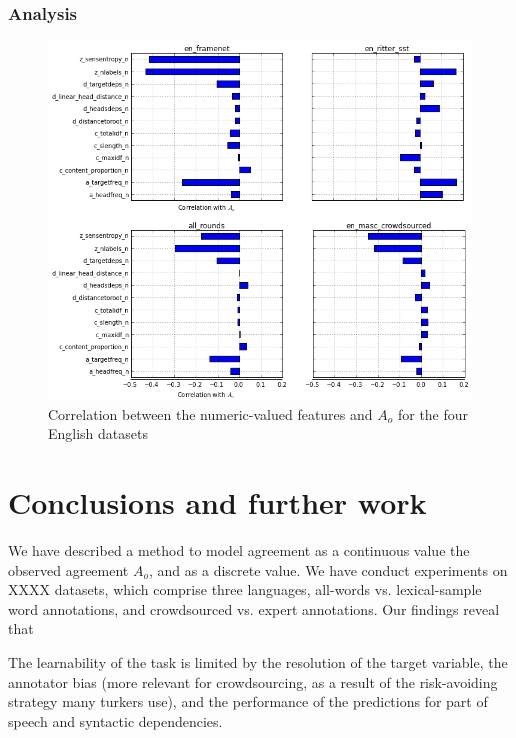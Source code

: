 \documentclass[11pt,a4paper]{article}
\begin{document}
%
%

\subsubsection{Analysis}

\begin{figure}[htt]
\includegraphics[scale=0.3]{corrtable.jpg}

\caption{ \label{fig:correlations}Correlation between the numeric-valued features and $A_o$ for the four English datasets}    
\end{figure}

\section{Conclusions and further work}

We have described a method to model agreement as a continuous value  the observed agreement $A_o$, and as a discrete value. We have conduct experiments on XXXX datasets, which comprise three languages, all-words vs. lexical-sample word annotations, and crowdsourced vs. expert annotations. Our findings reveal that 

 The learnability of the task is limited by the resolution of the target variable, the annotator bias (more relevant for crowdsourcing, as a result of the risk-avoiding strategy many turkers use), and the performance of the predictions for part of speech and syntactic dependencies.
\end{document}
